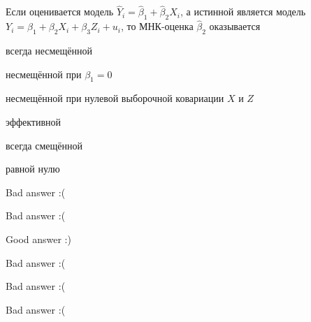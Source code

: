 
\begin{question}
Если оценивается модель \(\hat Y_i = \hat \beta_1 + \hat \beta_2 X_i\),
а истинной является модель \(Y_i = \beta_1 + \beta_2 X_i + \beta_3 Z_i + u_i\),
то МНК-оценка \(\hat \beta_2\) оказывается
\begin{answerlist}
  \item всегда несмещённой
  \item несмещённой при \(\beta_1 = 0\)
  \item несмещённой при нулевой выборочной ковариации \(X\) и \(Z\)
  \item эффективной
  \item всегда смещённой
  \item равной нулю
\end{answerlist}
\end{question}

\begin{solution}
\begin{answerlist}
  \item Bad answer :(
  \item Bad answer :(
  \item Good answer :)
  \item Bad answer :(
  \item Bad answer :(
  \item Bad answer :(
\end{answerlist}
\end{solution}

